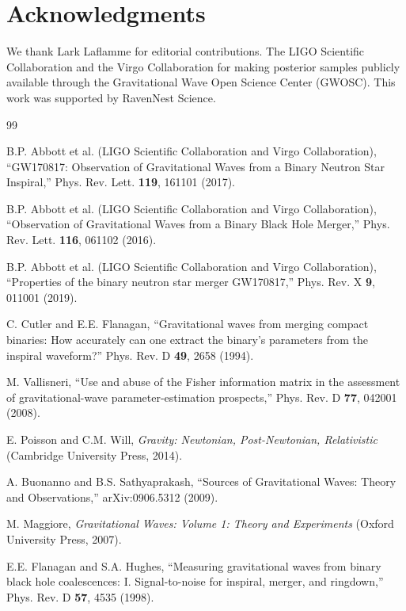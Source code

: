 \documentclass[twocolumn,prd,showpacs,superscriptaddress]{revtex4-2}
\begin{document}
\section*{Acknowledgments}

We thank Lark Laflamme for editorial contributions. The LIGO Scientific Collaboration and the Virgo Collaboration for making posterior samples publicly available through the Gravitational Wave Open Science Center (GWOSC). This work was supported by RavenNest Science.

\begin{thebibliography}{99}

B.P. Abbott et al. (LIGO Scientific Collaboration and Virgo Collaboration),
``GW170817: Observation of Gravitational Waves from a Binary Neutron Star Inspiral,''
Phys. Rev. Lett. \textbf{119}, 161101 (2017).

B.P. Abbott et al. (LIGO Scientific Collaboration and Virgo Collaboration),
``Observation of Gravitational Waves from a Binary Black Hole Merger,''
Phys. Rev. Lett. \textbf{116}, 061102 (2016).

B.P. Abbott et al. (LIGO Scientific Collaboration and Virgo Collaboration),
``Properties of the binary neutron star merger GW170817,''
Phys. Rev. X \textbf{9}, 011001 (2019).

C. Cutler and E.E. Flanagan,
``Gravitational waves from merging compact binaries: How accurately can one extract the binary's parameters from the inspiral waveform?''
Phys. Rev. D \textbf{49}, 2658 (1994).

M. Vallisneri,
``Use and abuse of the Fisher information matrix in the assessment of gravitational-wave parameter-estimation prospects,''
Phys. Rev. D \textbf{77}, 042001 (2008).

E. Poisson and C.M. Will,
\emph{Gravity: Newtonian, Post-Newtonian, Relativistic}
(Cambridge University Press, 2014).

A. Buonanno and B.S. Sathyaprakash,
``Sources of Gravitational Waves: Theory and Observations,''
arXiv:0906.5312 (2009).

M. Maggiore,
\emph{Gravitational Waves: Volume 1: Theory and Experiments}
(Oxford University Press, 2007).

E.E. Flanagan and S.A. Hughes,
``Measuring gravitational waves from binary black hole coalescences: I. Signal-to-noise for inspiral, merger, and ringdown,''
Phys. Rev. D \textbf{57}, 4535 (1998).


\end{thebibliography}
\end{document}
